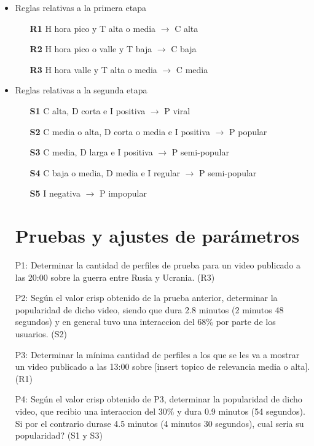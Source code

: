 \documentclass{article}
\begin{document}
\begin{itemize}
	\item Reglas relativas a la primera etapa
	\begin{itemize}
		\item [\textbf{R1}] H hora pico y T alta o media $\rightarrow$ C alta 
		\item [\textbf{R2}] H hora pico o valle y T baja $\rightarrow$ C baja 
		\item [\textbf{R3}] H hora valle y T alta o media $\rightarrow$ C media 
	\end{itemize}
	\item Reglas relativas a la segunda etapa
	\begin{itemize}
		\item [\textbf{S1}] C alta, D corta e I positiva $\rightarrow$ P viral
		\item [\textbf{S2}] C media o alta, D corta o media e I positiva $\rightarrow$ P popular
		\item [\textbf{S3}] C media, D larga e I positiva $\rightarrow$ P semi-popular
		\item [\textbf{S4}] C baja o media, D media e I regular $\rightarrow$ P semi-popular
		\item [\textbf{S5}] I negativa $\rightarrow$ P impopular

\end{itemize}

\section{Pruebas y ajustes de parámetros}

 P1: Determinar la cantidad de perfiles de prueba para un video publicado a las 20:00 sobre la guerra entre Rusia y Ucrania. (R3)

 P2: Según el valor crisp obtenido de la prueba anterior, determinar la popularidad de dicho video, siendo que dura 2.8 minutos (2 minutos 48 segundos) y en general tuvo una interaccion del $68\%$ por parte de los usuarios. (S2)

 P3: Determinar la mínima cantidad de perfiles a los que se les va a mostrar un video publicado a las 13:00 sobre [insert topico de relevancia media o alta]. (R1)

 P4: Según el valor crisp obtenido de P3, determinar la popularidad de dicho video, que recibio una interaccion del $30\%$ y dura 0.9 minutos (54 segundos). Si por el contrario durase 4.5 minutos (4 minutos 30 segundos), cual seria su popularidad? (S1 y S3)




\end{itemize}
\end{document}
